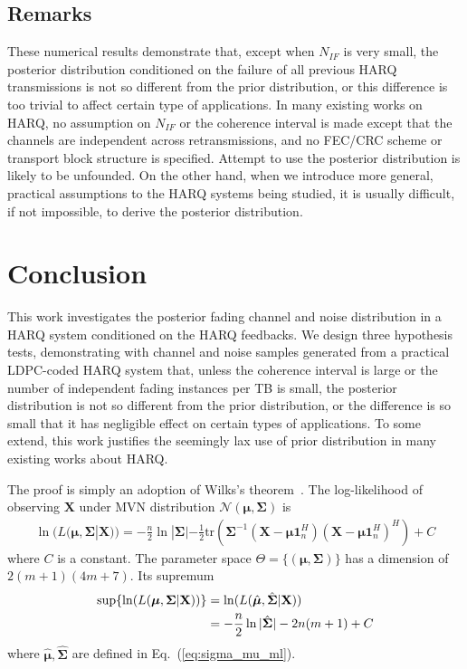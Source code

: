 \documentclass[journal,draftcls,onecolumn,12pt,twoside]{IEEEtran}
\begin{document}
\subsection{Remarks}
These numerical results demonstrate that, except when $N_{IF}$ is very small,
the posterior distribution conditioned on the failure of all previous HARQ
transmissions is not so different from the prior distribution, or this
difference is too trivial to affect certain type of applications. 
In many existing works on HARQ, no assumption on $N_{IF}$ or the coherence
interval is made except that the channels are independent across
retransmissions, and no FEC/CRC scheme or transport block structure is
specified. Attempt to use the posterior distribution is likely to be unfounded.
On the other hand, when we introduce more general, practical assumptions to the
HARQ systems being studied, it is usually difficult, if not impossible, to
derive the posterior distribution.

\section{Conclusion}
\label{sec:conclusion}
This work investigates the posterior fading channel and noise distribution in
a HARQ system conditioned on the HARQ feedbacks. We design three hypothesis tests,
demonstrating with channel and noise samples generated from a practical
LDPC-coded HARQ system that, unless the coherence interval is large or the
number of independent fading instances per TB is small, the posterior distribution is
not so different from the prior distribution, or the difference is so small that
it has negligible effect on certain types of applications. To some extend, this
work justifies the seemingly lax use of prior distribution in many existing
works about HARQ.

\label{append:proof}
The proof is simply an adoption of Wilks's theorem~\cite{wilks1938large}. The
log-likelihood of observing $\mathbf{X}$ under MVN distribution
$\mathcal{N}(\bm{\mu}, \mathbf{\Sigma})$ is
\begin{align}
  \ln(L(\bm{\mu}, \mathbf{\Sigma}|\mathbf{X})) =
  -\frac{n}{2}\ln|\mathbf{\Sigma}|-
  \frac{1}{2}\mbox{tr}(\mathbf{\Sigma}^{-1}(\mathbf{X}
  -\bm{\mu}\mathbf{1}_n^H)(\mathbf{X} -\bm{\mu}\mathbf{1}_n^H)^H) + C  
\end{align}
where $C$ is a constant. The parameter space $\Theta = \{(\bm{\mu},
\mathbf{\Sigma})\}$ has a dimension of $2(m+1)(4m+7)$. Its supremum
\begin{align}
  \sup \{\ln(L(\bm{\mu}, \mathbf{\Sigma}|\mathbf{X}))\} & =
  \ln(L(\hat{\bm{\mu}}, \hat{\mathbf{\Sigma}}|\mathbf{X})) \notag\\
  & = -\frac{n}{2}\ln|\hat{\mathbf{\Sigma}}| - 2n(m+1) + C
\end{align}
where $\hat{\bm{\mu}}, \hat{\mathbf{\Sigma}}$ are defined in
Eq.~(\ref{eq:sigma_mu_ml}).
\end{document}
